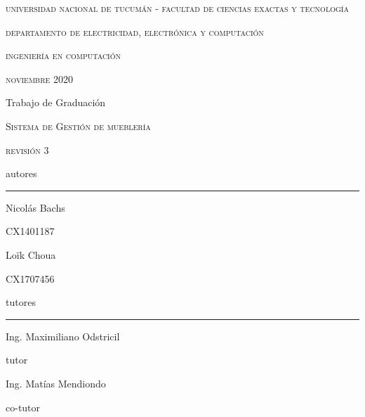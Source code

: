 \documentclass[a4paper,oneside]{book}
\begin{document}
\sloppy

\begin{titlepage}
	\centering
	{\scshape universidad nacional de tucumán - facultad de ciencias exactas y tecnología\par}
	{\scshape departamento de electricidad, electrónica y computación\par}
	{\scshape\Large ingeniería en computación\par}
	\vspace{0.5cm}
	{\scshape noviembre 2020\par} %
	\vfill
	{\LARGE\mdseries Trabajo de Graduación\par}
	\vspace{0.5cm}
	{\scshape\huge Sistema de Gestión de mueblería\par}
	{\scshape revisión 3\par}
	\vfill
	{\mdseries autores\par}
	\par\noindent\rule{0.9\textwidth}{0.2pt}
	\begin{multicols}{2}
	{\large Nicolás Bachs\par}
	{\small CX1401187\par}
	\columnbreak
	{\large Loïk Choua\par}
	{\small CX1707456\par}
	\end{multicols}
	\vspace{0.5cm}
	{\mdseries tutores\par}
	\par\noindent\rule{0.9\textwidth}{0.2pt}
	\begin{multicols}{2}
	{\large Ing. Maximiliano Odstricil\par}
	{\small tutor\par}
	\columnbreak
	{\large Ing. Matías Mendiondo\par}
	{\small co-tutor\par}
	\end{multicols}
\end{titlepage}



\tableofcontents










%
\end{document}
